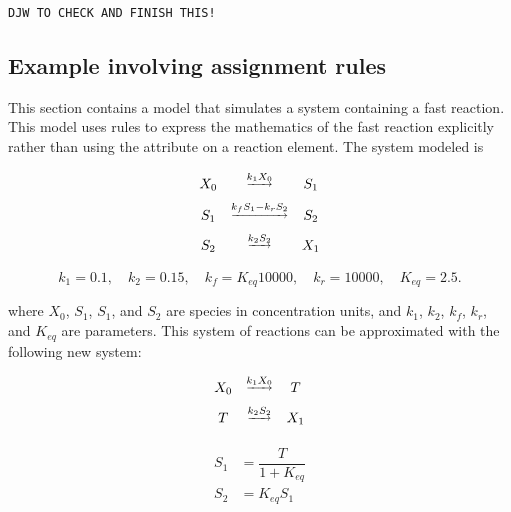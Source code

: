 \texttt{DJW TO CHECK AND FINISH THIS!}


\subsection{Example involving assignment rules}
\label{apdx:rules-eg}

This section contains a model that simulates a system containing a
fast reaction.  This model uses rules to express the mathematics
of the fast reaction explicitly rather than using the 
attribute on a reaction element.  The system modeled is
\begin{linenomath}
\begin{equation*}
  \begin{array}{@{}ccc@{}}
    X_0 & \overset{\underrightarrow{k_1 X_0}}{}           & S_1 \\[6pt]
    S_1 & \overset{\underrightarrow{k_f S_1 - k_r S_2}}{} & S_2 \\[6pt]
    S_2 & \overset{\underrightarrow{k_2 S_2}}{}           & X_1 \\[6pt]
  \end{array}
\end{equation*}
\begin{equation*}
    k_1 = 0.1, \quad k_2 = 0.15, \quad k_f = K_{eq} 10000, \quad k_r = 10000, \quad K_{eq} = 2.5.
\end{equation*}
\end{linenomath}
where $X_0$, $S_1$, $S_1$, and $S_2$ are species in concentration units,
and $k_1$, $k_2$, $k_f$, $k_r$, and $K_{eq}$ are parameters.  This
system of reactions can be approximated with the following new
system:
\begin{linenomath}
\begin{equation*}
  \begin{array}{@{}ccc@{}}
    X_0 & \overset{\underrightarrow{k_1 X_0}}{} & T \\[6pt]
    T & \overset{\underrightarrow{k_2 S_2}}{} & X_1\\[6pt]
  \end{array}
\end{equation*}
\begin{equation*}
\begin{aligned}
    S_1 &= \dfrac{T}{1 + K_{eq}} \\[6pt]
    S_2 &= K_{eq} S_1
  \end{aligned}
\end{equation*}
\end{linenomath}

